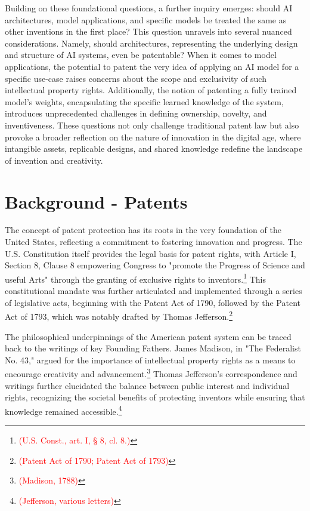 \documentclass{article}[10pt]
\begin{document}
Building on these foundational questions, a further inquiry emerges: should AI architectures, model applications, and specific models be treated the same as other inventions in the first place? 
This question unravels into several nuanced considerations. 
Namely, should architectures, representing the underlying design and structure of AI systems, even be patentable? 
When it comes to model applications, the potential to patent the very idea of applying an AI model for a specific use-case raises concerns about the scope and exclusivity of such intellectual property rights. 
Additionally, the notion of patenting a fully trained model's weights, encapsulating the specific learned knowledge of the system, introduces unprecedented challenges in defining ownership, novelty, and inventiveness. 
These questions not only challenge traditional patent law but also provoke a broader reflection on the nature of innovation in the digital age, where intangible assets, replicable designs, and shared knowledge redefine the landscape of invention and creativity.

\section{Background - Patents}

The concept of patent protection has its roots in the very foundation of the United States, reflecting a commitment to fostering innovation and progress. 
The U.S. Constitution itself provides the legal basis for patent rights, with Article I, Section 8, Clause 8 empowering Congress to "promote the Progress of Science and useful Arts" through the granting of exclusive rights to inventors.\footnote{
    \textcolor{red}{(U.S. Const., art. I, § 8, cl. 8.)}} 
This constitutional mandate was further articulated and implemented through a series of legislative acts, beginning with the Patent Act of 1790, followed by the Patent Act of 1793, which was notably drafted by Thomas Jefferson.\footnote{
    \textcolor{red}{(Patent Act of 1790; Patent Act of 1793)}}\par

The philosophical underpinnings of the American patent system can be traced back to the writings of key Founding Fathers. 
James Madison, in "The Federalist No. 43," argued for the importance of intellectual property rights as a means to encourage creativity and advancement.\footnote{
    \textcolor{red}{(Madison, 1788)}} 
Thomas Jefferson's correspondence and writings further elucidated the balance between public interest and individual rights, recognizing the societal benefits of protecting inventors while ensuring that knowledge remained accessible.\footnote{
    \textcolor{red}{(Jefferson, various letters)}}\par
\end{document}
